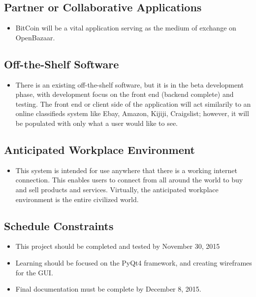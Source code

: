 \documentclass{article}
\begin{document}
\subsection{Partner or Collaborative Applications}
\begin{itemize}

\item
BitCoin will be a vital application serving as the medium of exchange on OpenBazaar.

\end{itemize}

\subsection{Off-the-Shelf Software}
\begin{itemize}
	
\item
There is an existing off-the-shelf software, but it is in the beta development phase, with development focus on the front end (backend complete) and testing. The front end or client side of the application will act similarily to an online classifieds system like Ebay, Amazon, Kijiji, Craigslist; however, it will be populated with only what a user would like to see.	

	
\end{itemize}

\subsection{Anticipated Workplace Environment}
\begin{itemize}
	
\item
This system is intended for use anywhere that there is a working internet connection. This enables users to connect from all around the world to buy and sell products and services. Virtually, the anticipated workplace environment is the entire civilized world.
	
	
\end{itemize}

\subsection{Schedule Constraints}
\begin{itemize}
	
\item
This project should be completed and tested by November 30, 2015
\item
Learning should be focused on the PyQt4 framework, and creating wireframes for the GUI.
\item
Final documentation must be complete by December 8, 2015.
	
\end{itemize}
\end{document}
